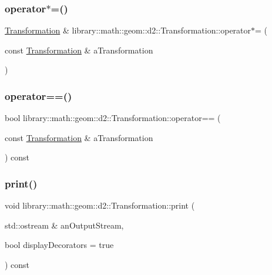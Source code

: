 \subsubsection{\texorpdfstring{operator$\ast$=()}{operator*=()}}
{\footnotesize\ttfamily \hyperlink{classlibrary_1_1math_1_1geom_1_1d2_1_1_transformation}{Transformation} \& library\+::math\+::geom\+::d2\+::\+Transformation\+::operator$\ast$= (\begin{DoxyParamCaption}\item[{const \hyperlink{classlibrary_1_1math_1_1geom_1_1d2_1_1_transformation}{Transformation} \&}]{a\+Transformation }\end{DoxyParamCaption})}

\mbox{\label{classlibrary_1_1math_1_1geom_1_1d2_1_1_transformation_a57ebdbb1a7932034cb476bd0121a0684}} 
\subsubsection{\texorpdfstring{operator==()}{operator==()}}
{\footnotesize\ttfamily bool library\+::math\+::geom\+::d2\+::\+Transformation\+::operator== (\begin{DoxyParamCaption}\item[{const \hyperlink{classlibrary_1_1math_1_1geom_1_1d2_1_1_transformation}{Transformation} \&}]{a\+Transformation }\end{DoxyParamCaption}) const}

\mbox{\label{classlibrary_1_1math_1_1geom_1_1d2_1_1_transformation_a39eab30cef450921059006ee72a8f8e8}} 
\subsubsection{\texorpdfstring{print()}{print()}}
{\footnotesize\ttfamily void library\+::math\+::geom\+::d2\+::\+Transformation\+::print (\begin{DoxyParamCaption}\item[{std\+::ostream \&}]{an\+Output\+Stream,  }\item[{bool}]{display\+Decorators = {\ttfamily true} }\end{DoxyParamCaption}) const\hspace{0.3cm}{\ttfamily [virtual]}}



